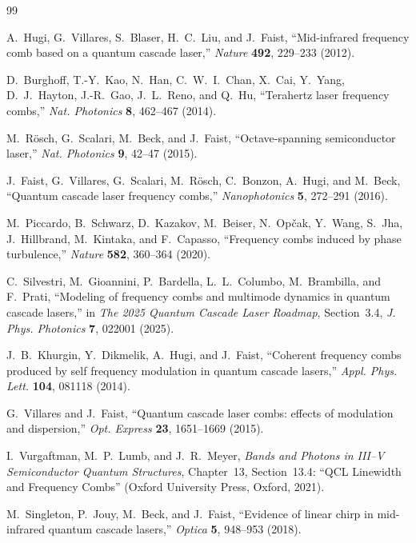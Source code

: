 \documentclass[11pt,letterpaper]{article}
\begin{document}
\begin{thebibliography}{99}

A.~Hugi, G.~Villares, S.~Blaser, H.~C.~Liu, and J.~Faist, ``Mid-infrared frequency comb based on a quantum cascade laser,'' \textit{Nature} \textbf{492}, 229--233 (2012).

D.~Burghoff, T.-Y.~Kao, N.~Han, C.~W.~I.~Chan, X.~Cai, Y.~Yang, D.~J.~Hayton, J.-R.~Gao, J.~L.~Reno, and Q.~Hu, ``Terahertz laser frequency combs,'' \textit{Nat. Photonics} \textbf{8}, 462--467 (2014).

M.~R\"osch, G.~Scalari, M.~Beck, and J.~Faist, ``Octave-spanning semiconductor laser,'' \textit{Nat. Photonics} \textbf{9}, 42--47 (2015).

J.~Faist, G.~Villares, G.~Scalari, M.~R\"osch, C.~Bonzon, A.~Hugi, and M.~Beck, ``Quantum cascade laser frequency combs,'' \textit{Nanophotonics} \textbf{5}, 272--291 (2016).

M.~Piccardo, B.~Schwarz, D.~Kazakov, M.~Beiser, N.~Op\v{c}ak, Y.~Wang, S.~Jha, J.~Hillbrand, M.~Kintaka, and F.~Capasso, ``Frequency combs induced by phase turbulence,'' \textit{Nature} \textbf{582}, 360--364 (2020).

C.~Silvestri, M.~Gioannini, P.~Bardella, L.~L.~Columbo, M.~Brambilla, and F.~Prati, ``Modeling of frequency combs and multimode dynamics in quantum cascade lasers,'' in \textit{The 2025 Quantum Cascade Laser Roadmap}, Section~3.4, \textit{J. Phys. Photonics} \textbf{7}, 022001 (2025).

J.~B.~Khurgin, Y.~Dikmelik, A.~Hugi, and J.~Faist, ``Coherent frequency combs produced by self frequency modulation in quantum cascade lasers,'' \textit{Appl. Phys. Lett.} \textbf{104}, 081118 (2014).

G.~Villares and J.~Faist, ``Quantum cascade laser combs: effects of modulation and dispersion,'' \textit{Opt. Express} \textbf{23}, 1651--1669 (2015).

I.~Vurgaftman, M.~P.~Lumb, and J.~R.~Meyer, \textit{Bands and Photons in III--V Semiconductor Quantum Structures}, Chapter~13, Section~13.4: ``QCL Linewidth and Frequency Combs'' (Oxford University Press, Oxford, 2021).

M.~Singleton, P.~Jouy, M.~Beck, and J.~Faist, ``Evidence of linear chirp in mid-infrared quantum cascade lasers,'' \textit{Optica} \textbf{5}, 948--953 (2018).


\end{thebibliography}
\end{document}
